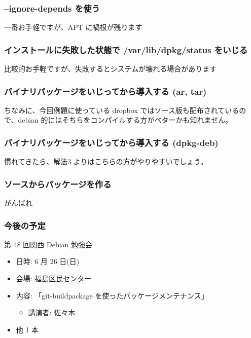 \documentclass[cjk,dvipdfmx,12pt,%
hyperref={bookmarks=true,bookmarksnumbered=true,bookmarksopen=false,%
colorlinks=false,%
pdftitle={第 47 回 関西 Debian 勉強会},%
pdfauthor={倉敷・のがた・佐々木},%
pdfsubject={資料},%
}]{beamer}
\begin{document}
\begin{frame}[fragile]
\frametitle{--ignore-depends を使う}
一番お手軽ですが、APT に禍根が残ります

\end{frame}



\begin{frame}[fragile]
\frametitle{インストールに失敗した状態で /var/lib/dpkg/status をいじる}
比較的お手軽ですが、失敗するとシステムが壊れる場合があります
\end{frame}

\begin{frame}[fragile]
\frametitle{バイナリパッケージをいじってから導入する (ar, tar)}
ちなみに、今回例題に使っている dropbox ではソース版も配布されているので、debian 的にはそちらをコンパイルする方がベターかも知れません。
\end{frame}

\begin{frame}[fragile]
\frametitle{バイナリパッケージをいじってから導入する (dpkg-deb)}
慣れてきたら、解法3 よりはこちらの方がやりやすいでしょう。
\end{frame}

\begin{frame}[fragile]
\frametitle{ソースからパッケージを作る}
がんばれ
\end{frame}


\begin{frame}[fragile]
\frametitle{今後の予定}

\begin{block}{第 48 回関西 Debian 勉強会}
  \begin{itemize}
  \item 日時: 6 月 26 日(日)
  \item 会場: 福島区民センター
  \item 内容: 「git-buildpackage を使ったパッケージメンテナンス」
    \begin{itemize}
    \item 講演者: 佐々木
    \end{itemize}
  \item 他 1 本
  \end{itemize}
\end{block}

\end{frame}

\takahashi[50]{  }
\end{document}
